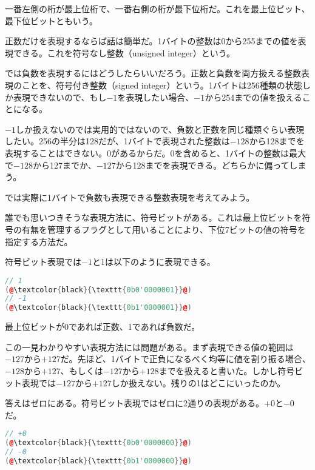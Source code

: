 一番左側の桁が最上位桁で、一番右側の桁が最下位桁だ。これを最上位ビット、最下位ビットともいう。

正数だけを表現するならば話は簡単だ。1バイトの整数は0から255までの値を表現できる。これを符号なし整数（unsigned integer）という。

では負数を表現するにはどうしたらいいだろう。正数と負数を両方扱える整数表現のことを、符号付き整数（signed integer）という。1バイトは256種類の状態しか表現できないので、もし\(-1\)を表現したい場合、\(-1\)から254までの値を扱えることになる。

\(-1\)しか扱えないのでは実用的ではないので、負数と正数を同じ種類ぐらい表現したい。256の半分は128だが、1バイトで表現された整数は\(-128\)から128までを表現することはできない。0があるからだ。0を含めると、1バイトの整数は最大で\(-128\)から127までか、\(-127\)から128までを表現できる。どちらかに偏ってしまう。

では実際に1バイトで負数も表現できる整数表現を考えてみよう。


誰でも思いつきそうな表現方法に、符号ビットがある。これは最上位ビットを符号の有無を管理するフラグとして用いることにより、下位7ビットの値の符号を指定する方法だ。

符号ビット表現では\(-1\)と1は以下のように表現できる。

\begin{lstlisting}[language={C++}]
// 1
(@\textcolor{black}{\texttt{0b0'0000001}}@)
// -1
(@\textcolor{black}{\texttt{0b1'0000001}}@)
\end{lstlisting}

最上位ビットが0であれば正数、1であれば負数だ。

この一見わかりやすい表現方法には問題がある。まず表現できる値の範囲は\(-127\)から\(+127\)だ。先ほど、1バイトで正負になるべく均等に値を割り振る場合、\(-128\)から\(+127\)、もしくは\(-127\)から\(+128\)までを扱えると書いた。しかし符号ビット表現では\(-127\)から\(+127\)しか扱えない。残りの1はどこにいったのか。

答えはゼロにある。符号ビット表現ではゼロに2通りの表現がある。\(+0\)と\(-0\)だ。

\begin{lstlisting}[language={C++}]
// +0
(@\textcolor{black}{\texttt{0b0'0000000}}@)
// -0
(@\textcolor{black}{\texttt{0b1'0000000}}@)
\end{lstlisting}

